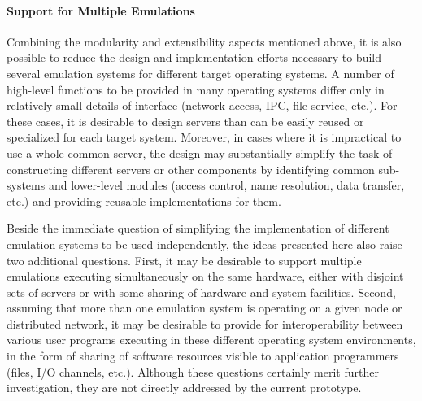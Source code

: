 

\paragraph{Support for Multiple Emulations}
Combining the modularity and extensibility aspects mentioned above, it
is also possible to reduce the design and implementation efforts
necessary to build several emulation systems for different target
operating systems. A number of high-level functions to be provided in
many operating systems differ only in relatively small details of
interface (network access, IPC, file service, etc.). For these cases,
it is desirable to design servers than can be easily reused or
specialized for each target system.  Moreover, in cases where it is
impractical to use a whole common server, the design may substantially
simplify the task of constructing different servers or other
components by identifying common sub-systems and lower-level modules
(access control, name resolution, data transfer, etc.) and providing
reusable implementations for them.


Beside the immediate question of simplifying the implementation of
different emulation systems to be used independently, the ideas
presented here also raise two additional questions. First, it may be
desirable to support multiple emulations executing simultaneously on
the same hardware, either with disjoint sets of servers or with some
sharing of hardware and system facilities. Second, assuming that more
than one emulation system is operating on a given node or distributed
network, it may be desirable to provide for interoperability between
various user programs executing in these different operating system
environments, in the form of sharing of software resources visible to
application programmers (files, I/O channels, etc.).  Although these
questions certainly merit further investigation, they are not directly
addressed by the current prototype.

